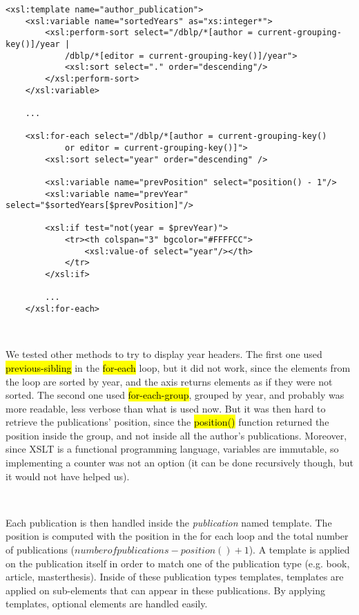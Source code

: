 \begin{lstlisting}
<xsl:template name="author_publication">
    <xsl:variable name="sortedYears" as="xs:integer*">
        <xsl:perform-sort select="/dblp/*[author = current-grouping-key()]/year |
            /dblp/*[editor = current-grouping-key()]/year">
            <xsl:sort select="." order="descending"/>
        </xsl:perform-sort>
    </xsl:variable>

    ...

    <xsl:for-each select="/dblp/*[author = current-grouping-key()
            or editor = current-grouping-key()]">
        <xsl:sort select="year" order="descending" />

        <xsl:variable name="prevPosition" select="position() - 1"/>
        <xsl:variable name="prevYear" select="$sortedYears[$prevPosition]"/>

        <xsl:if test="not(year = $prevYear)">
            <tr><th colspan="3" bgcolor="#FFFFCC">
                <xsl:value-of select="year"/></th>
            </tr>
        </xsl:if>

        ...
    </xsl:for-each>
\end{lstlisting}
\

\begin{framewarning}
We tested other methods to try to display year headers. The first one used
\hl{previous-sibling} in the \hl{for-each} loop, but it did not work, since the
elements from the loop are sorted by year, and the axis returns elements as if
they were not sorted. The second one used \hl{for-each-group}, grouped by year,
and probably was more readable, less verbose than what is used now. But it was
then hard to retrieve the publications' position, since the \hl{position()}
function returned the position inside the group, and not inside all the author's
publications. Moreover, since XSLT is a functional programming language, variables
are immutable, so implementing a counter was not an option (it can be done
recursively though, but it would not have helped us).
\end{framewarning}
\

Each publication is then handled inside the \emph{publication} named template.
The position is computed with the position in the for each loop and the total
number of publications ($number of publications - position() + 1$). A template
is applied on the publication itself in order to match one of the publication
type (e.g. book, article, masterthesis). Inside of these publication types
templates, templates are applied on sub-elements that can appear in these
publications. By applying templates, optional elements are handled easily.
\newpage

